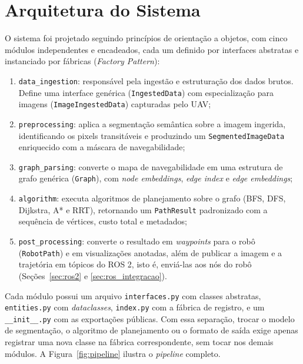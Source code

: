 \documentclass[
    12pt,
    openright,
    oneside,
    a4paper,
    english,
    brazil
]{abntex2}
\begin{document}
\section{Arquitetura do Sistema}
\label{sec:arquitetura}

O sistema foi projetado seguindo princípios de orientação a objetos, com cinco módulos independentes e encadeados, cada um definido por interfaces abstratas e instanciado por fábricas (\textit{Factory Pattern}):

\begin{enumerate}
    \item \texttt{data\_\allowbreak{}ingestion}: responsável pela ingestão e estruturação dos dados brutos. Define uma interface genérica (\texttt{IngestedData}) com especialização para imagens (\texttt{Image\allowbreak Ingested\allowbreak Data}) capturadas pelo UAV;
    \item \texttt{preprocessing}: aplica a segmentação semântica sobre a imagem ingerida, identificando os pixels transitáveis e produzindo um \texttt{SegmentedImageData} enriquecido com a máscara de navegabilidade;
    \item \texttt{graph\_\allowbreak{}parsing}: converte o mapa de navegabilidade em uma estrutura de grafo genérica (\texttt{Graph}), com \textit{node embeddings}, \textit{edge index} e \textit{edge embeddings};
    \item \texttt{algorithm}: executa algoritmos de planejamento sobre o grafo (BFS, DFS, Dijkstra, A* e RRT), retornando um \texttt{PathResult} padronizado com a sequência de vértices, custo total e metadados;
    \item \texttt{post\_\allowbreak{}processing}: converte o resultado em \textit{waypoints} para o robô (\texttt{RobotPath}) e em visualizações anotadas, além de publicar a imagem e a trajetória em tópicos do ROS 2, isto é, enviá-las aos nós do robô (Seções~\ref{sec:ros2} e \ref{sec:ros_integracao}).
\end{enumerate}

Cada módulo possui um arquivo \texttt{interfaces.py} com classes abstratas, \texttt{entities.py} com \textit{dataclasses}, \texttt{index.py} com a fábrica de registro, e um \texttt{\_\allowbreak{}\_\allowbreak{}init\_\allowbreak{}\_\allowbreak{}.py} com as exportações públicas. Com essa separação, trocar o modelo de segmentação, o algoritmo de planejamento ou o formato de saída exige apenas registrar uma nova classe na fábrica correspondente, sem tocar nos demais módulos. A Figura~\ref{fig:pipeline} ilustra o \textit{pipeline} completo.
\end{document}
